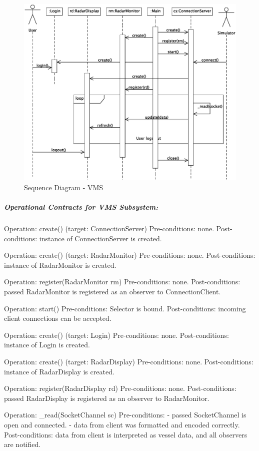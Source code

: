 \documentclass{article}
\begin{document}
\begin{figure}[!htb]
\caption{Sequence Diagram - VMS}
\centering
\includegraphics[scale=0.6]{diagrams/vms-sequence-diagram.eps}
\end{figure}

\subparagraph{Operational Contracts for VMS Subsystem:}

Operation: create() (target: ConnectionServer)
Pre-conditions: none.
Post-conditions: instance of ConnectionServer is created.

Operation: create() (target: RadarMonitor)
Pre-conditions: none.
Post-conditions: instance of RadarMonitor is created.

Operation: register(RadarMonitor rm)
Pre-conditions: none.
Post-conditions: passed RadarMonitor is registered as an observer to ConnectionClient.

Operation: start()
Pre-conditions: Selector is bound.
Post-conditions: incoming client connections can be accepted.

Operation: create() (target: Login)
Pre-conditions: none.
Post-conditions: instance of Login is created.

Operation: create() (target: RadarDisplay)
Pre-conditions: none.
Post-conditions: instance of RadarDisplay is created.

Operation: register(RadarDisplay rd)
Pre-conditions: none.
Post-conditions: passed RadarDisplay is registered as an observer to RadarMonitor.

Operation: \_read(SocketChannel sc)
Pre-conditions:
- passed SocketChannel is open and connected.
- data from client was formatted and encoded correctly.
Post-conditions: data from client is interpreted as vessel data, and all observers are notified.
\end{document}

